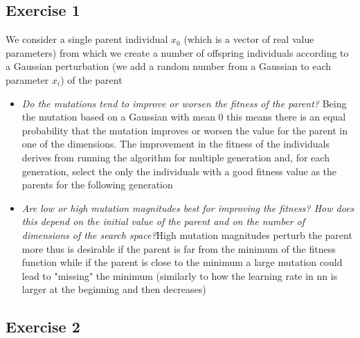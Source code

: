 \subsection{Exercise 1}
We consider a single parent individual \(x_0\) (which is a vector of real value parameters) from which we create a number of offspring individuals according to a Gaussian perturbation (we add a random number from a Gaussian to each parameter \(x_i\)) of the parent
\begin{itemize}
    \item \textit{Do the mutations tend to improve or worsen the fitness of the parent?} Being the mutation based on a Gaussian with mean 0 this means there is an equal probability that the mutation improves or worsen the value for the parent in one of the dimensions. The improvement in the fitness of the individuals derives from running the algorithm for multiple generation and, for each generation, select the only the individuals with a good fitness value as the parents for the following generation
    \item \textit{Are low or high mutation magnitudes best for improving the fitness? How does this depend on the initial value of the parent and on the number of dimensions of the search space?}High mutation magnitudes perturb the parent more thus is desirable if the parent is far from the minimum of the fitness function while if the parent is close to the minimum a large mutation could lead to "missing" the minimum (similarly to how the learning rate in nn is larger at the beginning and then decreases)
\end{itemize}

\subsection{Exercise 2}
